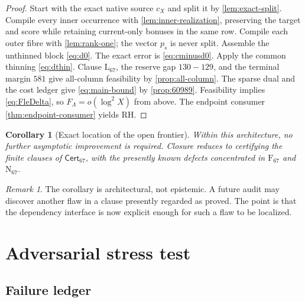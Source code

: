 \documentclass[11pt]{article}
\newtheorem{corollary}[theorem]{Corollary}
\theoremstyle{definition}
\theoremstyle{remark}
\newtheorem{remark}[theorem]{Remark}
\newcommand{\RH}{\mathrm{RH}}
\newcommand{\1}{\mathbf 1}
\newcommand{\Cert}{\mathsf{Cert}_{67}}
\begin{document}
\begin{proof}
Start with the exact native source \(c_X\) and split it by \cref{lem:exact-split}.  Compile every inner occurrence with \cref{lem:inner-realization}, preserving the target and score while retaining current-only bonuses in the same row.  Compile each outer fibre with \cref{lem:rank-one}; the vector \(p_s\) is never split.  Assemble the unthinned block \eqref{eq:d0}.  The exact error is \eqref{eq:cminusd0}.  Apply the common thinning \eqref{eq:dthin}.  Clause \(\mathrm L_{67}\), the reserve gap \(130-129\), and the terminal margin \(581\) give all-column feasibility by \cref{prop:all-column}.  The sparse dual and the cost ledger give \eqref{eq:main-bound} by \cref{prop:60989}.  Feasibility implies \eqref{eq:FleDelta}, so \(F_\Lambda=o(\log^2X)\) from above.  The endpoint consumer \cref{thm:endpoint-consumer} yields \(\RH\).
\end{proof}

\begin{corollary}[Exact location of the open frontier]\label{cor:frontier}
Within this architecture, no further asymptotic improvement is required.  Closure reduces to certifying the finite clauses of \(\Cert\), with the presently known defects concentrated in \(\mathrm F_{67}\) and \(\mathrm N_{67}\).
\end{corollary}

\begin{remark}
The corollary is architectural, not epistemic.  A future audit may discover another flaw in a clause presently regarded as proved.  The point is that the dependency interface is now explicit enough for such a flaw to be localized.
\end{remark}

\section{Adversarial stress test}\label{sec:audit}

\subsection{Failure ledger}
\end{document}

